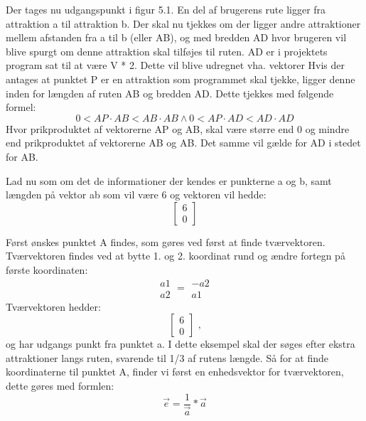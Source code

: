 Der tages nu udgangspunkt i figur 5.1. En del af brugerens rute ligger fra attraktion a til attraktion b. Der skal nu tjekkes om der ligger andre attraktioner mellem afstanden fra a til b (eller AB), og med bredden AD hvor brugeren vil blive spurgt om denne attraktion skal tilføjes til ruten. AD er i projektets program sat til at være V * 2. Dette vil blive udregnet vha. vektorer 
Hvis der antages at punktet P er en attraktion som programmet skal tjekke, ligger denne inden for længden af ruten AB og bredden AD. Dette tjekkes med følgende formel:
\[0 < AP \cdot AB < AB \cdot AB \wedge 0 < AP \cdot AD < AD \cdot AD \]
Hvor prikproduktet af vektorerne AP og AB, skal være større end 0 og mindre end prikproduktet af vektorerne AB og AB. Det samme vil gælde for AD i stedet for AB.

Lad nu som om det de informationer der kendes er punkterne a og b, samt længden på vektor ab som vil være 6 og vektoren vil hedde:
\[ \begin{bmatrix} 6 \\ 0 \end{bmatrix} \]

Først ønskes punktet A findes, som gøres ved først at finde tværvektoren. Tværvektoren findes ved at bytte 1. og 2. koordinat rund og ændre fortegn på første koordinaten:
\[ \begin{matrix} a1 \\ a2 \end{matrix} = \begin{matrix} -a2 \\ a1 \end{matrix} \]
Tværvektoren hedder: 
\[ \begin{bmatrix} 6 \\ 0 \end{bmatrix} \text{ ,} \]
og har udgangs punkt fra punktet a. \newline
I dette eksempel skal der søges efter ekstra attraktioner langs ruten, svarende til 1/3 af rutens længde. Så for at finde koordinaterne til punktet A, finder vi først en enhedsvektor for tværvektoren, dette gøres med formlen:
\[ \overrightarrow{e} = \frac{1}{\overrightarrow{a}}*\overrightarrow{a} \] 

